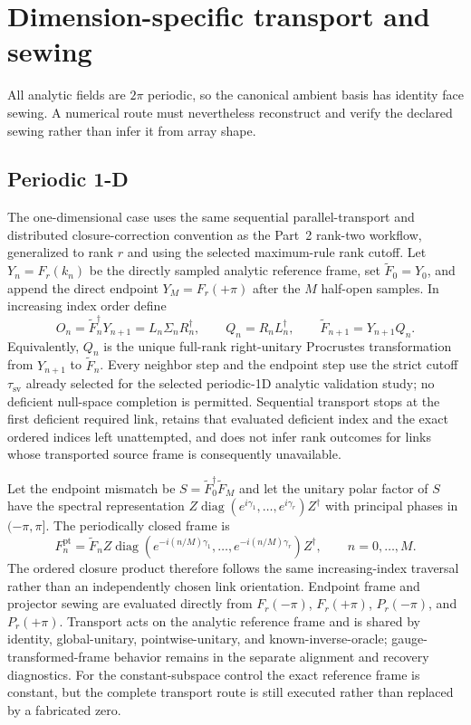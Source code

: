 \documentclass[11pt]{article}
\begin{document}
\section{Dimension-specific transport and sewing}

All analytic fields are $2\pi$ periodic, so the canonical ambient basis has identity
face sewing. A numerical route must nevertheless reconstruct and verify the declared
sewing rather than infer it from array shape.

\subsection{Periodic 1-D}

The one-dimensional case uses the same sequential parallel-transport and distributed
closure-correction convention as the Part~2 rank-two workflow, generalized to rank $r$
and using the selected maximum-rule rank cutoff. Let $Y_n=F_r(k_n)$ be the directly sampled
analytic reference frame, set $\widetilde F_0=Y_0$, and append the direct endpoint
$Y_M=F_r(+\pi)$ after the $M$ half-open samples. In increasing index order define
\[
 O_n=\widetilde F_n^\dagger Y_{n+1}=L_n\Sigma_nR_n^\dagger,
 \qquad Q_n=R_nL_n^\dagger,
 \qquad \widetilde F_{n+1}=Y_{n+1}Q_n .
\]
Equivalently, $Q_n$ is the unique full-rank right-unitary Procrustes transformation from
$Y_{n+1}$ to $\widetilde F_n$. Every neighbor step and the endpoint step use the strict
cutoff $\tau_{\mathrm{sv}}$ already selected for the selected periodic-1D analytic validation study; no deficient null-space completion is
permitted. Sequential transport stops at the first deficient required link, retains that
evaluated deficient index and the exact ordered indices left unattempted, and does not
infer rank outcomes for links whose transported source frame is consequently unavailable.

Let the endpoint mismatch be $S=\widetilde F_0^\dagger\widetilde F_M$ and let the unitary
polar factor of $S$ have the spectral representation
$Z\operatorname{diag}(e^{i\gamma_1},\ldots,e^{i\gamma_r})Z^\dagger$ with principal phases
in $(-\pi,\pi]$. The periodically closed frame is
\[
 F_n^{\mathrm{pt}}=\widetilde F_n
 Z\operatorname{diag}\!\left(e^{-i(n/M)\gamma_1},\ldots,
 e^{-i(n/M)\gamma_r}\right)Z^\dagger,
 \qquad n=0,\ldots,M.
\]
The ordered closure product therefore follows the same increasing-index traversal rather
than an independently chosen link orientation. Endpoint frame and projector sewing are
evaluated directly from $F_r(-\pi)$, $F_r(+\pi)$, $P_r(-\pi)$, and $P_r(+\pi)$.
Transport acts on the analytic reference frame and is shared by identity, global-unitary, pointwise-unitary, and known-inverse-oracle; gauge-transformed-frame
behavior remains in the separate alignment and recovery diagnostics. For the constant-subspace control the exact
reference frame is constant, but the complete transport route is still executed rather
than replaced by a fabricated zero.
\end{document}
